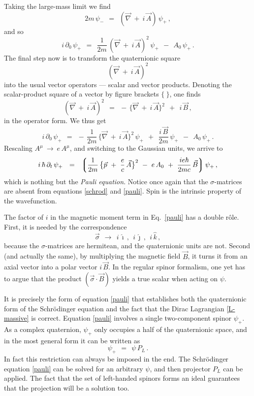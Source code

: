 \documentclass[epsfig,12pt]{article}
\newcommand{\p}{\partial}
\newcommand{\lgr}{\left\lgroup}
\newcommand{\rgr}{\right\rgroup}
\newcommand{\ii}{\hat\imath}
\newcommand{\jj}{\hat\jmath}
\newcommand{\kk}{\hat k}
\begin{document}
	Taking the large-mass limit we find
\[
	2m\,\psi_-	~~=~~	(\vec\nabla ~+~ i\,\vec A)\,\psi_+\,,
\]
	and so
\begin{equation}
	i\,\p_0\,\psi_+		~~=~~
		\frac 1 {2m}\, (\vec\nabla ~+~ i\,\vec A)^2\, \psi_+  ~~-~~  A_0\, \psi_+\,.
\end{equation}
	The final step now is to transform the quaternionic square
\[
	(\vec\nabla ~+~ i\,\vec A)^2
\]
	into the usual vector operators --- scalar and vector products.
	Denoting the scalar-product square of a vector by figure brackets $ \{~ \} $,
	one finds
\[
	(\vec\nabla ~+~ i\,\vec A)^2	~~=~~	-\, \big\{\vec\nabla ~+~ i\,\vec A\big\}^2  ~~+~~  i\,\vec B\,,
\]
	in the operator form.
	We thus get
\begin{equation}
\label{schrod}
	i\,\p_0\,\psi_+		~~=~~
		-\,\frac 1 {2m}\, \big\{ \vec\nabla ~+~ i\,\vec A\big \}^2\,\psi_+
		~~+~~  \frac{i\,\vec B}{2m}\, \psi_+  ~~-~~  A_0\,\psi_+\,.
\end{equation}
	Rescaling $ A^\mu ~\to~ e\,A^\mu $, and switching to the Gaussian units,
	we arrive to
\begin{equation}
\label{pauli}
	i\,\hbar\,\p_t\,\psi_+	~~=~~
		\lgr
			\frac 1 {2m}\, \big\{ \vec p ~+~ \frac e c\,\vec A \big\}^2
			~-~  e\,A_0
			~+~  \frac{i e \hbar}{2 m c}\,\vec B
		\rgr \psi_+\,,
\end{equation}
	which is nothing but the \emph{Pauli equation}.
	Notice once again that the $ \sigma $-matrices are absent from equations \eqref{schrod} and \eqref{pauli}.
	Spin is the intrinsic property of the wavefunction.

	The factor of $ i $ in the magnetic moment term in Eq.~\eqref{pauli} has a double r\^ole.
	First, it is needed by the correspondence
\[
	\vec \sigma	~~\to~~		i\,\ii\,,~~ i\,\jj\,,~~ i\,\kk\,,
\]
	because the $ \sigma $-matrices are hermitean, and the quaternionic units are not.
	Second (and actually the same), by multiplying the magnetic field $ \vec B $,
	it turns it from an axial vector into a polar vector $ i\,\vec B $.
	In the regular spinor formalism, one yet has to argue that the product $ (\vec\sigma \cdot \vec B) $
	yields a true scalar when acting on $ \psi $.

	It is precisely the form of equation \eqref{pauli} that establishes both the quaternionic form
	of the Schr\"odinger equation
	and the fact that the Dirac Lagrangian \eqref{L-massive} is correct.
	Equation \eqref{pauli} involves a single two-component spinor $ \psi_+ $.
	As a complex quaternion, $ \psi_+ $ only occupies a half of the quaternionic space,
	and in the most	general form it can be written as
\[
	\psi_+		~~=~~	\psi\,P_L\,.
\]
	In fact this restriction can always be imposed in the end.
	The Schr\"odinger equation \eqref{pauli} can be solved for an arbitrary $ \psi $,
	and then projector $ P_L $ can be applied.
	The fact that the set of left-handed spinors forms an ideal guarantees that
	the projection will be a solution too.
\end{document}
